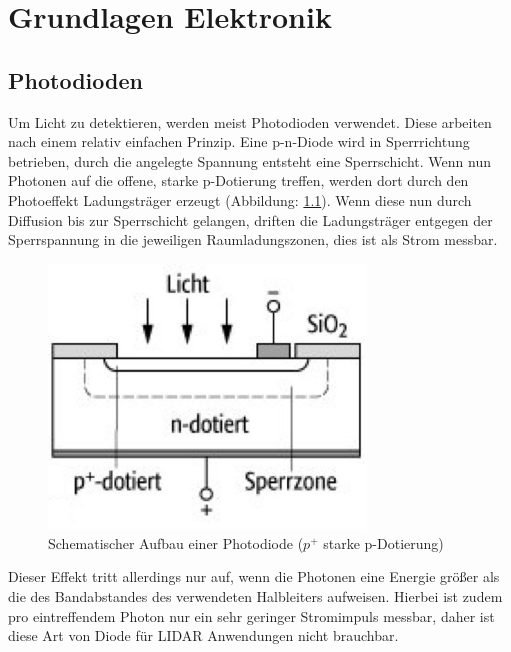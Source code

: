 
\chapter{Grundlagen Elektronik}\label{chap:grundlagen_et}
\section{Photodioden}\label{sec:photodioden}
Um Licht zu detektieren, werden meist Photodioden verwendet. Diese arbeiten nach einem relativ einfachen Prinzip.
Eine p-n-Diode wird in Sperrrichtung betrieben, durch die angelegte Spannung entsteht eine Sperrschicht. Wenn nun Photonen auf die offene, starke p-Dotierung treffen, werden dort durch den Photoeffekt Ladungsträger erzeugt (Abbildung: \ref{photodiode}). Wenn diese nun durch Diffusion bis zur Sperrschicht gelangen, driften die Ladungsträger entgegen der Sperrspannung in die jeweiligen Raumladungszonen, dies ist als Strom messbar. \cite{Photodiode_spektrum}
\begin{figure}[H]
	\centering
	\includegraphics[width=0.75\textwidth]{images/GrundlagenLaserentfernungsmessung/Photodiode}
	\caption{Schematischer Aufbau einer Photodiode \cite{Photodiode_spektrum} ($p^+$ starke p-Dotierung)}
	\label{photodiode}
\end{figure}
Dieser Effekt tritt allerdings nur auf, wenn die Photonen eine Energie größer als die des Bandabstandes des verwendeten Halbleiters aufweisen. Hierbei ist zudem pro eintreffendem Photon nur ein sehr geringer Stromimpuls messbar, daher ist diese Art von Diode für \ac{LIDAR} Anwendungen nicht brauchbar.

